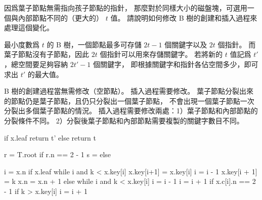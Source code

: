 \startEXERCISE
因爲葉子節點無需指向孩子節點的指針，
那麼對於同樣大小的磁盤塊，可選用一個與內部節點不同的（更大的） $t$ 值。
請說明如何修改 B 樹的創建和插入過程來處理這個變化。
\stopEXERCISE

\startANSWER
最小度數爲 $t$ 的 B 樹，一個節點最多可存儲 $2t-1$ 個關鍵字以及 $2t$ 個指針。
而葉子節點沒有子節點，因此 $2t$ 個指針可以用來存儲關鍵字。
若將新的 $t$ 值記爲 $t'$，總空間要足夠容納 $2t'-1$ 個關鍵字，
即根據關鍵字和指針各佔空間多少，即可求出 $t'$ 的最大值。

B 樹的創建過程當無需修改（空節點）。
插入過程需要修改。
葉子節點分裂出來的節點仍是葉子節點，且仍只分裂出一個葉子節點，
不會出現一個葉子節點一次分裂出多個葉子節點的情況。
插入過程需要修改兩處：1）葉子節點和內部節點的分裂條件不同。
2）分裂後葉子節點和內部節點需要複製的關鍵字數目不同。

\startCLRSCODE
if x.leaf
	return t'
else
	return t
\stopCLRSCODE

\startCLRSCODE
r = T.root
if r.n == 2 \cdot {} - 1
	s = 
else
\stopCLRSCODE

\startCLRSCODE
i = x.n
if x.leaf
	while i  and k < x.key[i]
		x.key[i+1] = x.key[i]
		i = i - 1
	x.key[i + 1] = k
	x.n = x.n + 1
else
	while i  and k < x.key[i]
		i = i - 1
	i = i + 1
	if x.c[i].n == 2 \cdot {} - 1
		if k > x.key[i]
			i = i + 1
\stopCLRSCODE

\stopANSWER